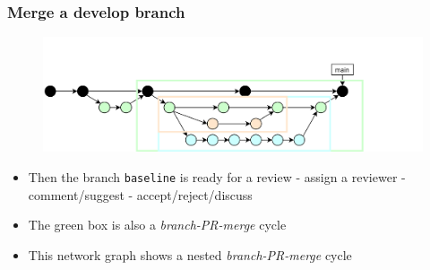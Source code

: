 \documentclass[aspectratio=169]{beamer} %
\begin{document}
\begin{frame}
	\frametitle{Merge a develop branch}

	\vspace{-.5cm}
	\begin{minipage}[t][5cm][t]{\textwidth}
		\begin{figure}
			\centering
			\includegraphics[width=\textwidth]{./img/dime-gitflow-network-2-6.png}
		\end{figure}
	\end{minipage}

	\vspace{-.5cm}
	\begin{minipage}[t][5cm][t]{\textwidth}
		\begin{itemize}
			\setlength\itemsep{.5em}
			\item Then the branch \texttt{baseline} is ready for a review - assign a reviewer - comment/suggest - accept/reject/discuss
			\item The green box is also a \textit{branch-PR-merge} cycle
			\item This network graph shows a nested \textit{branch-PR-merge} cycle
		\end{itemize}
	\end{minipage}
\end{frame}
\end{document}
